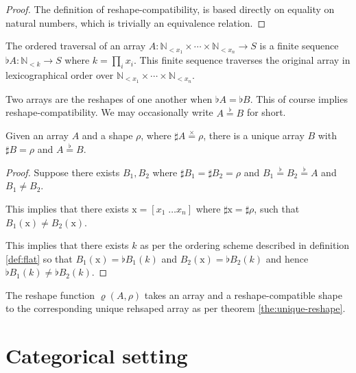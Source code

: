 \documentclass{DIKU-report}
\newcommand\brm[1]{\bm{\mathrm{#1}}}
\newcommand\Nat{\mathbb{N}}
\newcommand\prodeq{\stackrel{\times}{=}}
\newcommand\flateq{\stackrel{\flat}{=}}
\newcommand\contradict{\def\qed{\hspace*{\fill}\raisebox{-.2ex}{\lightning}}}
\begin{document}
\begin{proof}
  The definition of reshape-compatibility, is based directly on equality
  on natural numbers, which is trivially an equivalence relation.
\end{proof}

\begin{definition}
  \label{def:flat}
  The ordered traversal of an array \(A : \Nat_{<x_1} \times \cdots \times \Nat_{<x_n} \to S\) is
  a finite sequence \(\flat A : \Nat_{<k} \to S\) where \(k = \prod_i x_i\). This finite sequence
  traverses the original array in lexicographical order over \(\Nat_{<x_1} \times \cdots \times \Nat_{<x_n}\).
\end{definition}

\begin{definition}
  \label{def:reshape-equiv}
  Two arrays are the reshapes of one another when \(\flat A = \flat B\). This of course
  implies reshape-compatibility. We may occasionally write \(A \flateq B\) for short.
\end{definition}

\begin{theorem}
  \label{the:unique-reshape}
  Given an array \(A\) and a shape \(\rho\), where \(\sharp A \prodeq \rho\), there is a unique
  array \(B\) with \(\sharp B = \rho\) and \(A \flateq B\).
\end{theorem}
\begin{proof}
  Suppose there exists \(B_1, B_2\) where \(\sharp B_1 = \sharp B_2 = \rho\)
  and \(B_1 \flateq B_2 \flateq A\) and \(B_1 \neq B_2\).
  
  This implies that there exists \(\brm x = [x_1\; \dots x_n]\) where \(\sharp \brm x = \sharp \rho\),
  such that \(B_1(\brm x) \neq B_2(\brm x)\).

  This implies that there exists \(k\) as per the ordering scheme
  described in definition \ref{def:flat} so that \(B_1(\brm x) = \flat B_1 (k)\) and
  \(B_2(\brm x) = \flat B_2 (k)\) and hence \(\flat B_1(k) \neq \flat B_2(k)\). \contradict
\end{proof}

\begin{definition}
  The reshape function \(\varrho(A, \rho)\) takes an array and a reshape-compatible shape
  to the corresponding unique rehsaped array as per theorem \ref{the:unique-reshape}.
\end{definition}

\section{Categorical setting}
\end{document}
